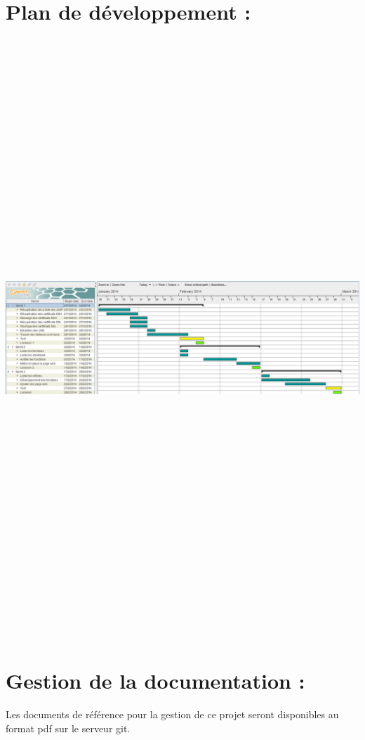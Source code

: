 \documentclass[a4paper,11pt,french]{article}
\begin{document}
\newpage

\section{Plan de développement :}

\begin{center}
\includegraphics[angle=90,height=22.5cm]{gantt-chart_v1.png}
\end{center}

\newpage

\section{Gestion de la documentation :}
Les documents de référence pour la gestion de ce projet seront disponibles au format pdf sur le serveur git. \\
\end{document}
